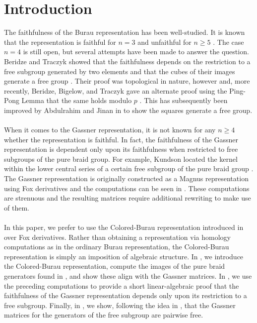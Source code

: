 \documentclass[11pt]{article}
\begin{document}
\section{Introduction}
The faithfulness of the Burau representation has been well-studied. It is known that the representation is faithful for $n=3$ and unfaithful for $n\geq 5$ \cite{big-bur}. The case $n=4$ is still open, but several attempts have been made to answer the question. Beridze and Traczyk showed that the faithfulness depends on the restriction to a free subgroup generated by two elements and that the cubes of their images generate a free group \cite{ber-tra}. Their proof was topological in nature, however and, more recently, Beridze, Bigelow, and Traczyk gave an alternate proof using the Ping-Pong Lemma that the same holds modulo $p$ \cite{ber-big-tra}. This has subsequently been improved by Abdulrahim and Jinan in \cite{abdul-jin} to show the squares generate a free group.
\\
\\
When it comes to the Gassner representation, it is not known for any $n\geq 4$ whether the representation is faithful. In fact, the faithfulness of the Gassner representation is dependent only upon its faithfulness when restricted to free subgroups of the pure braid group. For example, Kundson located the kernel within the lower central series of a certain free subgroup of the pure braid group \cite{knudson}. The Gassner representation is originally constructed as a Magnus representation using Fox derivatives and the computations can be seen in \cite{phdthesis}. These computations are strenuous and the resulting matrices require additional rewriting to make use of them.
\\
\\
In this paper, we prefer to use the Colored-Burau representation introduced in \cite{aagl} over Fox derivatives. Rather than obtaining a representation via homology computations as in the ordinary Burau representation, the Colored-Burau representation is simply an imposition of algebraic structure. In , we introduce the Colored-Burau representation, compute the images of the pure braid generators found in \cite{Birm}, and show these align with the Gassner matrices. In , we use the preceding computations to provide a short linear-algebraic proof that the faithfulness of the Gassner representation depends only upon its restriction to a free subgroup. Finally, in , we show, following the idea in \cite{lip}, that the Gassner matrices for the generators of the free subgroup are pairwise free.
\end{document}
